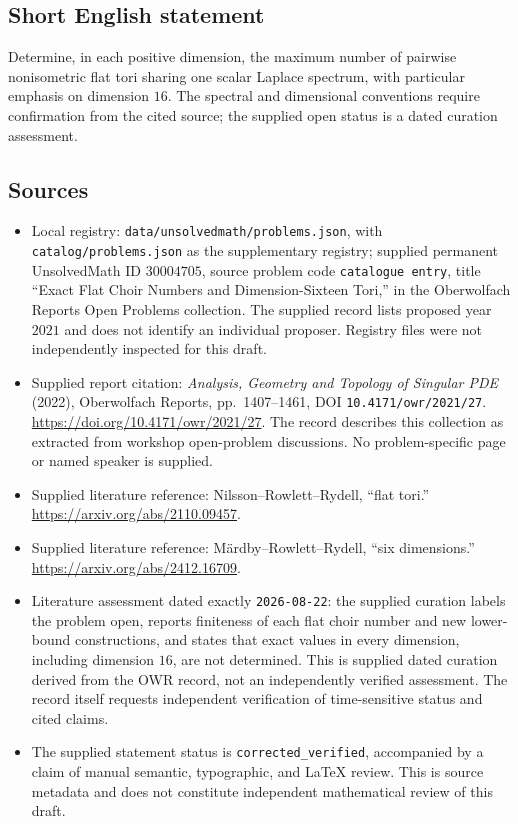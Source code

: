 \documentclass[11pt]{article}
\begin{document}
\subsection{Short English statement}
Determine, in each positive dimension, the maximum number of pairwise nonisometric flat tori sharing one scalar Laplace spectrum, with particular emphasis on dimension \(16\). The spectral and dimensional conventions require confirmation from the cited source; the supplied open status is a dated curation assessment.
\subsection{Sources}
\begin{itemize}
\item Local registry: \texttt{data/unsolvedmath/problems.json}, with \texttt{catalog/problems.json} as the supplementary registry; supplied permanent UnsolvedMath ID \(30004705\), source problem code \texttt{catalogue entry}, title ``Exact Flat Choir Numbers and Dimension-Sixteen Tori,'' in the Oberwolfach Reports Open Problems collection. The supplied record lists proposed year \(2021\) and does not identify an individual proposer. Registry files were not independently inspected for this draft.
\item Supplied report citation: \emph{Analysis, Geometry and Topology of Singular PDE} (2022), Oberwolfach Reports, pp.\ 1407--1461, DOI \texttt{10.4171/owr/2021/27}. \url{https://doi.org/10.4171/owr/2021/27}. The record describes this collection as extracted from workshop open-problem discussions. No problem-specific page or named speaker is supplied.
\item Supplied literature reference: Nilsson--Rowlett--Rydell, ``flat tori.'' \url{https://arxiv.org/abs/2110.09457}.
\item Supplied literature reference: M\"ardby--Rowlett--Rydell, ``six dimensions.'' \url{https://arxiv.org/abs/2412.16709}.
\item Literature assessment dated exactly \texttt{2026-08-22}: the supplied curation labels the problem open, reports finiteness of each flat choir number and new lower-bound constructions, and states that exact values in every dimension, including dimension \(16\), are not determined. This is supplied dated curation derived from the OWR record, not an independently verified assessment. The record itself requests independent verification of time-sensitive status and cited claims.
\item The supplied statement status is \texttt{corrected\_verified}, accompanied by a claim of manual semantic, typographic, and LaTeX review. This is source metadata and does not constitute independent mathematical review of this draft.
\end{itemize}
\end{document}
